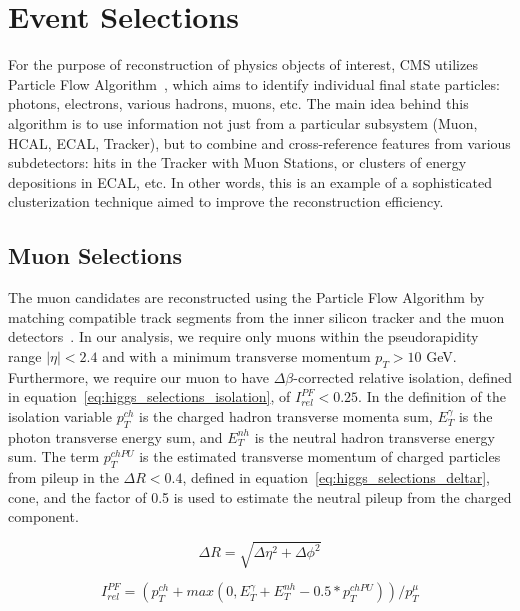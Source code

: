 \section{Event Selections} \label{section:higgs_selections}
For the purpose of reconstruction of physics objects of interest, CMS utilizes Particle Flow Algorithm~\cite{CMS-PAS-PFT-10-002}, which aims to identify individual final state particles: photons, electrons, various hadrons, muons, etc. The main idea behind this algorithm is to use information not just from a particular subsystem (Muon, HCAL, ECAL, Tracker), but to combine and cross-reference features from various subdetectors: hits in the Tracker with Muon Stations, or clusters of energy depositions in ECAL, etc. In other words, this is an example of a sophisticated clusterization technique aimed to improve the reconstruction efficiency.


\subsection{Muon Selections}
The muon candidates are reconstructed using the Particle Flow Algorithm by matching compatible track segments from the inner silicon tracker and the muon detectors~\cite{Chatrchyan:2012xi}. In our analysis, we require only muons within the pseudorapidity range $|\eta|<2.4$ and with a minimum transverse momentum $p_{T}>10$ GeV. Furthermore, we require our muon to have $\Delta \beta$-corrected relative isolation, defined in equation~\ref{eq:higgs_selections_isolation}, of $I_{rel}^{PF}<0.25$. In the definition of the isolation variable $p_{T}^{ch}$ is the charged hadron transverse momenta sum, $E_{T}^{\gamma}$ is the photon transverse energy sum, and $E_{T}^{nh}$ is the neutral hadron transverse energy sum. The term $p_{T}^{chPU}$ is the estimated transverse momentum of charged particles from pileup in the $\Delta R < 0.4$, defined in equation~\ref{eq:higgs_selections_deltar}, cone, and the factor of 0.5 is used to estimate the neutral pileup from the charged component.
\begin{center}
   \begin{equation}
      \label{eq:higgs_selections_deltar}
      {\Delta R} = {\sqrt{\Delta\eta^{2}+\Delta\phi^{2}}}
   \end{equation}
\end{center}
\begin{center}
   \begin{equation}
      \label{eq:higgs_selections_isolation}
      {I_{rel}^{PF}} = {(p_{T}^{ch}+max(0,E_{T}^{\gamma}+E_{T}^{nh}-0.5*p_{T}^{chPU}))/p_{T}^{\mu}}
   \end{equation}
\end{center}

